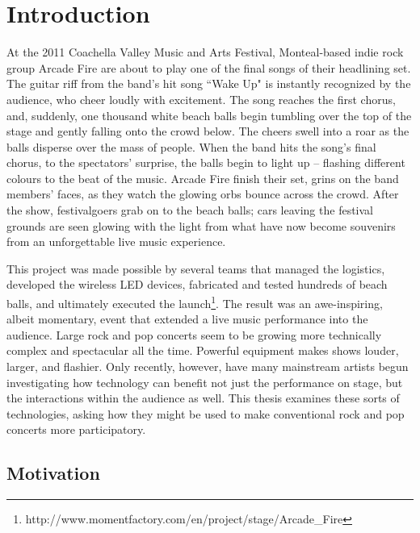 \chapter{Introduction}

At the 2011 Coachella Valley Music and Arts Festival, Monteal-based indie rock group Arcade Fire are about to play one of the final songs of their headlining set. The guitar riff from the band's hit song ``Wake Up" is instantly recognized by the audience, who cheer loudly with excitement. The song reaches the first chorus, and, suddenly, one thousand white beach balls begin tumbling over the top of the stage and gently falling onto the crowd below. The cheers swell into a roar as the balls disperse over the mass of people. When the band hits the song's final chorus, to the spectators' surprise, the balls begin to light up -- flashing different colours to the beat of the music. Arcade Fire finish their set, grins on the band members' faces, as they watch the glowing orbs bounce across the crowd. After the show, festivalgoers grab on to the beach balls; cars leaving the festival grounds are seen glowing with the light from what have now become souvenirs from an unforgettable live music experience.

This project was made possible by several teams that managed the logistics, developed the wireless LED devices, fabricated and tested hundreds of beach balls, and ultimately executed the launch\footnote{http://www.momentfactory.com/en/project/stage/Arcade\_Fire}. The result was an awe-inspiring, albeit momentary, event that extended a live music performance into the audience. Large rock and pop concerts seem to be growing more technically complex and spectacular all the time. Powerful equipment makes shows louder, larger, and flashier. Only recently, however, have many mainstream artists begun investigating how technology can benefit not just the performance on stage, but the interactions within the audience as well. This thesis examines these sorts of technologies, asking how they might be used to make conventional rock and pop concerts more participatory.




\section{Motivation}

